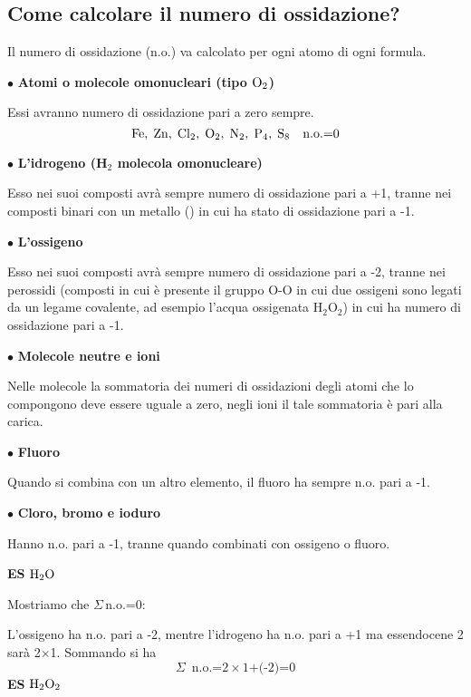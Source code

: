 \subsection{Come calcolare il numero di ossidazione?}
Il numero di ossidazione (n.o.) va calcolato per ogni atomo di ogni formula.

\vspace{0.2cm}$\bullet$ \textbf{Atomi o molecole omonucleari (tipo $\rm O_2$)}

Essi avranno numero di ossidazione pari a zero sempre.
$$\ce{Fe,\;Zn,\;Cl_2,\;O_2,\;N_2,\;P_4,\;S_8}\quad \text{n.o.=0}$$

\vspace{0.2cm}$\bullet$  \textbf{L'idrogeno (H$_2$ molecola omonucleare)}

Esso nei suoi composti avrà sempre numero di ossidazione pari a +1, tranne nei composti binari con un metallo () in cui ha stato di ossidazione pari a -1.

\vspace{0.2cm}$\bullet$  \textbf{L'ossigeno}

Esso nei suoi composti avrà sempre numero di ossidazione pari a -2, tranne nei perossidi (composti in cui è presente il gruppo O-O in cui due ossigeni sono legati da un legame covalente, ad esempio l'acqua ossigenata H$_2$O$_2$) in cui ha numero di ossidazione pari a -1.

\vspace{0.2cm}$\bullet$  \textbf{Molecole neutre e ioni}

Nelle molecole la sommatoria dei numeri di ossidazioni degli atomi che lo compongono deve essere uguale a zero, negli ioni il tale sommatoria è pari alla carica.

\vspace{0.2cm}$\bullet$ \textbf{Fluoro}

Quando si combina con un altro elemento, il fluoro ha sempre n.o. pari a -1.

\vspace{0.2cm}$\bullet$ \textbf{Cloro, bromo e ioduro}

Hanno n.o. pari a -1, tranne quando combinati con ossigeno o fluoro.

\vspace{0.2cm}\textbf{ES} $\rm H_2O$

\vspace{0.2cm}Mostriamo che $\Sigma\,$n.o.=0:

L'ossigeno ha n.o. pari a -2, mentre l'idrogeno ha n.o. pari a +1 ma essendocene 2 sarà 2$\times$1. Sommando si ha
$$\Sigma\,\text{ n.o.=2} \times \text{1+(-2)=0}$$
\textbf{ES} $\rm H_2O_2$

